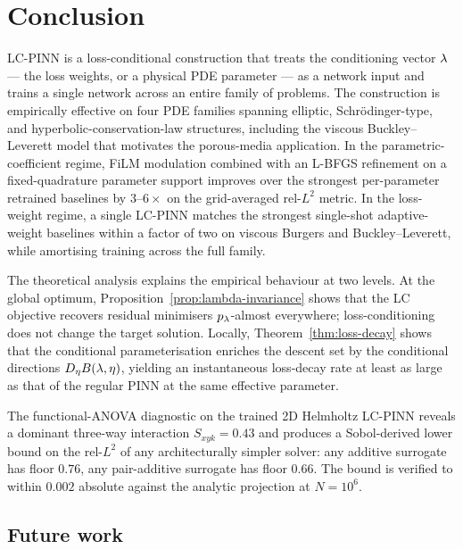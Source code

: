 \documentclass[12pt,a4paper]{extarticle}
\begin{document}
\newpage

\section{Conclusion}
\label{sec:conclusion}

LC-PINN is a loss-conditional construction that treats the conditioning vector $\lambda$ --- the loss weights, or a physical PDE parameter --- as a network input and trains a single network across an entire family of problems. The construction is empirically effective on four PDE families spanning elliptic, Schr\"{o}dinger-type, and hyperbolic-conservation-law structures, including the viscous Buckley--Leverett model that motivates the porous-media application. In the parametric-coefficient regime, FiLM modulation combined with an L-BFGS refinement on a fixed-quadrature parameter support improves over the strongest per-parameter retrained baselines by $3$--$6\times$ on the grid-averaged rel-$L^2$ metric. In the loss-weight regime, a single LC-PINN matches the strongest single-shot adaptive-weight baselines within a factor of two on viscous Burgers and Buckley--Leverett, while amortising training across the full family.

The theoretical analysis explains the empirical behaviour at two levels. At the global optimum, Proposition~\ref{prop:lambda-invariance} shows that the LC objective recovers residual minimisers $p_\lambda$-almost everywhere; loss-conditioning does not change the target solution. Locally, Theorem~\ref{thm:loss-decay} shows that the conditional parameterisation enriches the descent set by the conditional directions $D_\eta B(\lambda, \eta)$, yielding an instantaneous loss-decay rate at least as large as that of the regular PINN at the same effective parameter.

The functional-ANOVA diagnostic on the trained 2D Helmholtz LC-PINN reveals a dominant three-way interaction $S_{xyk} = 0.43$ and produces a Sobol-derived lower bound on the rel-$L^2$ of any architecturally simpler solver: any additive surrogate has floor $0.76$, any pair-additive surrogate has floor $0.66$. The bound is verified to within $0.002$ absolute against the analytic projection at $N = 10^6$.

\subsection{Future work}
\end{document}

